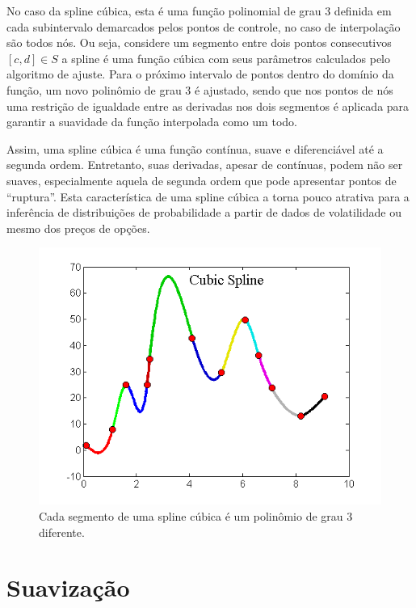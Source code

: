 \documentclass[]{book}
\theoremstyle{definition}
\theoremstyle{definition}
\theoremstyle{definition}
\theoremstyle{remark}
\begin{document}
No caso da spline cúbica, esta é uma função polinomial de grau 3 definida em cada subintervalo demarcados pelos pontos de controle, no caso de interpolação são todos nós. Ou seja, considere um segmento entre dois pontos consecutivos \([c, d]\in S\) a spline é uma função cúbica com seus parâmetros calculados pelo algoritmo de ajuste. Para o próximo intervalo de pontos dentro do domínio da função, um novo polinômio de grau 3 é ajustado, sendo que nos pontos de nós uma restrição de igualdade entre as derivadas nos dois segmentos é aplicada para garantir a suavidade da função interpolada como um todo.

Assim, uma spline cúbica é uma função contínua, suave e diferenciável até a segunda ordem. Entretanto, suas derivadas, apesar de contínuas, podem não ser suaves, especialmente aquela de segunda ordem que pode apresentar pontos de ``ruptura''. Esta característica de uma spline cúbica a torna pouco atrativa para a inferência de distribuições de probabilidade a partir de dados de volatilidade ou mesmo dos preços de opções.

\begin{figure}
\centering
\includegraphics{./images/cubic_spline.png}
\caption{\label{fig:cubic-spline}Cada segmento de uma spline cúbica é um polinômio de grau 3 diferente.}
\end{figure}

\hypertarget{suavizacao}{%
\section{Suavização}\label{suavizacao}}
\end{document}
